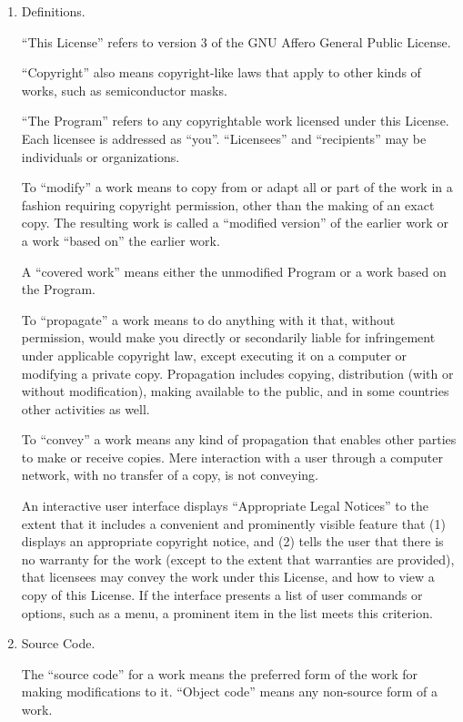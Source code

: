 \documentclass{article}%
\begin{document}
\begin{enumerate}

\addtocounter{enumi}{-1}

\item Definitions.

``This License'' refers to version 3 of the GNU Affero General Public License.

``Copyright'' also means copyright-like laws that apply to other kinds of
works, such as semiconductor masks.

``The Program'' refers to any copyrightable work licensed under this
License.        Each licensee is addressed as ``you''.  ``Licensees'' and
``recipients'' may be individuals or organizations.

To ``modify'' a work means to copy from or adapt all or part of the work
in a fashion requiring copyright permission, other than the making of an
exact copy.      The resulting work is called a ``modified version'' of the
earlier work or a work ``based on'' the earlier work.

A ``covered work'' means either the unmodified Program or a work based
on the Program.

To ``propagate'' a work means to do anything with it that, without
permission, would make you directly or secondarily liable for
infringement under applicable copyright law, except executing it on a
computer or modifying a private copy.    Propagation includes copying,
distribution (with or without modification), making available to the
public, and in some countries other activities as well.

To ``convey'' a work means any kind of propagation that enables other
parties to make or receive copies.      Mere interaction with a user through
a computer network, with no transfer of a copy, is not conveying.

An interactive user interface displays ``Appropriate Legal Notices''
to the extent that it includes a convenient and prominently visible
feature that (1) displays an appropriate copyright notice, and (2)
tells the user that there is no warranty for the work (except to the
extent that warranties are provided), that licensees may convey the
work under this License, and how to view a copy of this License.        If
the interface presents a list of user commands or options, such as a
menu, a prominent item in the list meets this criterion.

\item Source Code.

The ``source code'' for a work means the preferred form of the work
for making modifications to it.  ``Object code'' means any non-source
form of a work.


\end{enumerate}
\end{document}
